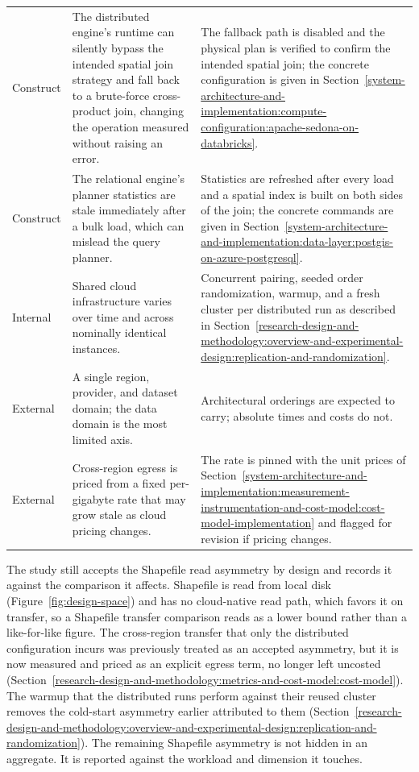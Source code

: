 \begin{longtable}{@{}l p{} p{}@{}}
	\addlinespace
    Construct & The distributed engine's runtime can silently bypass the intended spatial join strategy and fall back to a brute-force cross-product join, changing the operation measured without raising an error. & The fallback path is disabled and the physical plan is verified to confirm the intended spatial join; the concrete configuration is given in Section~\ref{system-architecture-and-implementation:compute-configuration:apache-sedona-on-databricks}. \\
    \addlinespace
	Construct & The relational engine's planner statistics are stale immediately after a bulk load, which can mislead the query planner. & Statistics are refreshed after every load and a spatial index is built on both sides of the join; the concrete commands are given in Section~\ref{system-architecture-and-implementation:data-layer:postgis-on-azure-postgresql}. \\
    \addlinespace
	Internal & Shared cloud infrastructure varies over time and across nominally identical instances. & Concurrent pairing, seeded order randomization, warmup, and a fresh cluster per distributed run as described in Section~\ref{research-design-and-methodology:overview-and-experimental-design:replication-and-randomization}. \\
	\addlinespace
	External & A single region, provider, and dataset domain; the data domain is the most limited axis. & Architectural orderings are expected to carry; absolute times and costs do not. \\
	\addlinespace
    External & Cross-region egress is priced from a fixed per-gigabyte rate that may grow stale as cloud pricing changes. & The rate is pinned with the unit prices of Section~\ref{system-architecture-and-implementation:measurement-instrumentation-and-cost-model:cost-model-implementation} and flagged for revision if pricing changes. \\
\end{longtable}

The study still accepts the Shapefile read asymmetry by design and records it against the comparison it affects. Shapefile is read from local disk (Figure~\ref{fig:design-space}) and has no cloud-native read path, which favors it on transfer, so a Shapefile transfer comparison reads as a lower bound rather than a like-for-like figure. The cross-region transfer that only the distributed configuration incurs was previously treated as an accepted asymmetry, but it is now measured and priced as an explicit egress term, no longer left uncosted (Section~\ref{research-design-and-methodology:metrics-and-cost-model:cost-model}). The warmup that the distributed runs perform against their reused cluster removes the cold-start asymmetry earlier attributed to them (Section~\ref{research-design-and-methodology:overview-and-experimental-design:replication-and-randomization}). The remaining Shapefile asymmetry is not hidden in an aggregate. It is reported against the workload and dimension it touches.